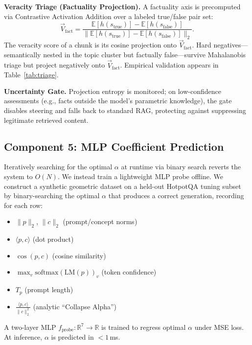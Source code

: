 \documentclass[conference]{IEEEtran}
\begin{document}
\textbf{Veracity Triage (Factuality Projection).} A factuality axis is precomputed via Contrastive Activation Addition over a labeled true/false pair set:
\begin{equation}
    \vec{V}_{\text{fact}} = \frac{\mathbb{E}[h(s_{\text{true}})] - \mathbb{E}[h(s_{\text{false}})]}{\|\mathbb{E}[h(s_{\text{true}})] - \mathbb{E}[h(s_{\text{false}})]\|_2}.
    \label{eq:vfact}
\end{equation}
The veracity score of a chunk is its cosine projection onto $\vec{V}_{\text{fact}}$. Hard negatives---semantically nested in the topic cluster but factually false---survive Mahalanobis triage but project negatively onto $\vec{V}_{\text{fact}}$. Empirical validation appears in Table~\ref{tab:triage}.

\textbf{Uncertainty Gate.} Projection entropy is monitored; on low-confidence assessments (e.g., facts outside the model's parametric knowledge), the gate disables steering and falls back to standard RAG, protecting against suppressing legitimate retrieved content.

\subsection{Component 5: MLP Coefficient Prediction}

Iteratively searching for the optimal $\alpha$ at runtime via binary search reverts the system to $O(N)$. We instead train a lightweight MLP probe offline. We construct a synthetic geometric dataset on a held-out HotpotQA tuning subset by binary-searching the optimal $\alpha$ that produces a correct generation, recording for each row:
\begin{itemize}
    \item $\|p\|_2$, $\|c\|_2$ (prompt/concept norms)
    \item $\langle p, c \rangle$ (dot product)
    \item $\cos(p, c)$ (cosine similarity)
    \item $\max_v \mathrm{softmax}(\text{LM}(p))_v$ (token confidence)
    \item $T_p$ (prompt length)
    \item $\frac{\langle p, c\rangle}{\|c\|_2^2}$ (analytic ``Collapse Alpha'')
\end{itemize}
A two-layer MLP $f_{\text{probe}}: \mathbb{R}^7 \to \mathbb{R}$ is trained to regress optimal $\alpha$ under MSE loss. At inference, $\alpha$ is predicted in $<1$\,ms.
\end{document}
